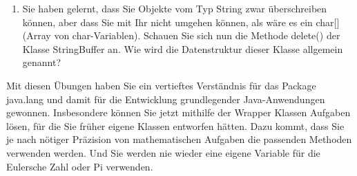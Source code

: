 \begin{enumerate}
	\item Sie haben gelernt, dass Sie Objekte vom Typ String zwar überschreiben können, aber dass Sie mit Ihr nicht umgehen können, als wäre es ein char[] (Array von char-Variablen). Schauen Sie sich nun die Methode delete() der Klasse StringBuffer an. Wie wird die Datenstruktur dieser Klasse allgemein genannt?

\end{enumerate}

Mit diesen Übungen haben Sie ein vertieftes Verständnis für das Package java.lang und damit für die Entwicklung grundlegender Java-Anwendungen gewonnen. Insbesondere können Sie jetzt mithilfe der Wrapper Klassen Aufgaben lösen, für die Sie früher eigene Klassen entworfen hätten. Dazu kommt, dass Sie je nach nötiger Präzision von mathematischen Aufgaben die passenden Methoden verwenden werden. Und Sie werden nie wieder eine eigene Variable für die Eulersche Zahl oder Pi verwenden.
